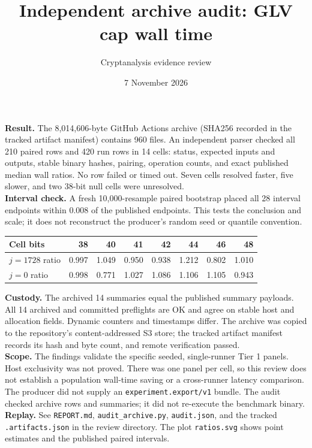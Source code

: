 \documentclass[10pt]{article}
\title{Independent archive audit: GLV cap wall time}
\author{Cryptanalysis evidence review}
\date{7 November 2026}
\begin{document}
\maketitle
\noindent\textbf{Result.} The 8,014,606-byte GitHub Actions archive (SHA256 recorded in the tracked artifact manifest) contains 960 files. An independent parser checked all 210 paired rows and 420 run rows in 14 cells: status, expected inputs and outputs, stable binary hashes, pairing, operation counts, and exact published median wall ratios. No row failed or timed out. Seven cells resolved faster, five slower, and two 38-bit null cells were unresolved.\\[6pt]
\noindent\textbf{Interval check.} A fresh 10,000-resample paired bootstrap placed all 28 interval endpoints within 0.008 of the published endpoints. This tests the conclusion and scale; it does not reconstruct the producer's random seed or quantile convention.\\[6pt]
\begin{center}\begin{tabular}{lrrrrrrr}\toprule
Cell bits&38&40&41&42&44&46&48\\\midrule
$j=1728$ ratio&0.997&1.049&0.950&0.938&1.212&0.802&1.010\\
$j=0$ ratio&0.998&0.771&1.027&1.086&1.106&1.105&0.943\\\bottomrule\end{tabular}\end{center}
\noindent\textbf{Custody.} The archived 14 summaries equal the published summary payloads. All 14 archived and committed preflights are OK and agree on stable host and allocation fields. Dynamic counters and timestamps differ. The archive was copied to the repository's content-addressed S3 store; the tracked artifact manifest records its hash and byte count, and remote verification passed.\\[6pt]
\noindent\textbf{Scope.} The findings validate the specific seeded, single-runner Tier 1 panels. Host exclusivity was not proved. There was one panel per cell, so this review does not establish a population wall-time saving or a cross-runner latency comparison. The producer did not supply an \texttt{experiment.export/v1} bundle. The audit checked archive rows and summaries; it did not re-execute the benchmark binary.\\[6pt]
\noindent\textbf{Replay.} See \texttt{REPORT.md}, \texttt{audit\_archive.py}, \texttt{audit.json}, and the tracked \texttt{.artifacts.json} in the review directory. The plot \texttt{ratios.svg} shows point estimates and the published paired intervals.
\end{document}
